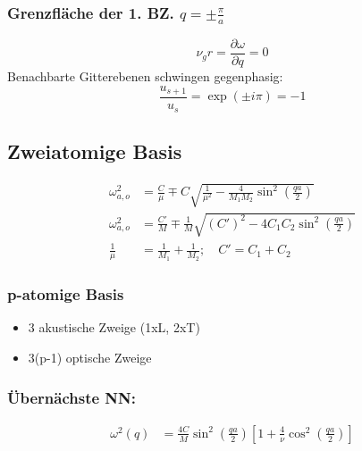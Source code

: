 \subsubsection*{Grenzfläche der 1. BZ. $q = \pm \frac{\pi}{a}$}
\begin{equation*}
    \nu_gr = \frac{\partial \omega}{\partial q} = 0
\end{equation*}
Benachbarte Gitterebenen schwingen gegenphasig:
\begin{equation*}
    \frac{u_{s+1}}{u_s} = \exp \left(\pm i \pi\right) = -1
\end{equation*}

\subsection*{Zweiatomige Basis}

\begin{equation*}
    \begin{aligned}
        \omega_{a,o}^2 &= \frac{C}{\mu} \mp C \sqrt{\frac{1}{\mu^2}- \frac{4}{M_1M_2} \sin^2\left(\frac{qa}{2}\right)} \\
        \omega_{a,o}^2 &= \frac{C'}{M} \mp \frac{1}{M} \sqrt{(C')^2- 4C_1 C_2 \sin^2\left(\frac{qa}{2}\right)} \\
        \frac{1}{\mu} &= \frac{1}{M_1} + \frac{1}{M_2}; \quad C' = C_1 + C_2
    \end{aligned}
\end{equation*}

\subsubsection*{p-atomige Basis}

\begin{itemize}
    \itemsep 0pt
    \item 3 akustische Zweige (1xL, 2xT)
    \item 3(p-1) optische Zweige
\end{itemize}

\subsubsection*{Übernächste NN:}
\begin{equation*}
    \begin{aligned}
        \omega^2(q) &= \frac{4C}{M} \sin^2\left(\frac{qa}{2}\right) \left[1+\frac{4}{\nu}\cos^2\left(\frac{qa}{2}\right)\right]
    \end{aligned}
\end{equation*}
